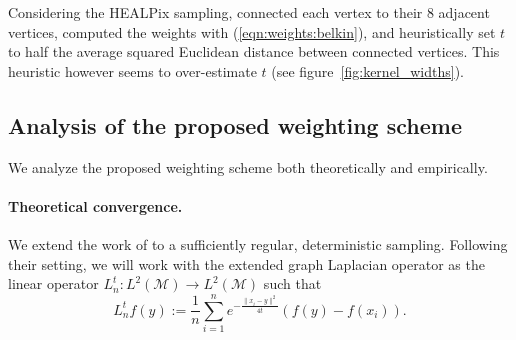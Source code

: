 \documentclass{article} %
\newcommand{\figref}[1]{figure~\ref{fig:#1}}
\newcommand{\eqnref}[1]{(\ref{eqn:#1})}
\begin{document}
Considering the HEALPix sampling, \citet{perraudin2019deepspherecosmo} connected each vertex to their 8 adjacent vertices, computed the weights with \eqnref{weights:belkin}, and heuristically set $t$ to half the average squared Euclidean distance between connected vertices.
This heuristic however seems to over-estimate $t$ (see \figref{kernel_widths}).

\subsection{Analysis of the proposed weighting scheme}

We analyze the proposed weighting scheme both theoretically and empirically.

\paragraph{Theoretical convergence.}
We extend the work of \citep{belkin2005towards} to a sufficiently regular, deterministic sampling.
Following their setting, we will work with the extended graph Laplacian operator as the linear operator $L_n^t: L^{2}(\mathcal{M}) \rightarrow L^{2}(\mathcal{M})$ such that
\begin{equation} \label{eq:Heat Kernel Graph Laplacian operator}
	 L_n^t f(y) := \frac{1}{n}\sum_{i=1}^{n} e^{ -\frac{\|x_i-y\|^2}{4t}} \left(f(y)-f(x_i)\right).
\end{equation}
\end{document}
